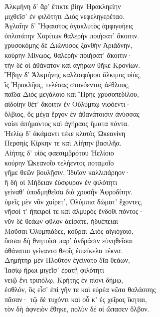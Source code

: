 \begin{pages}
\begin{Leftside}
\quad{}Ἀλκμήνη δ' ἄρ' ἔτικτε βίην Ἡρακληείην\\
μιχθεῖσ' ἐν φιλότητι Διὸς νεφεληγερέταο. \\

\quad{}Ἀγλαΐην δ' Ἥφαιστος ἀγακλυτὸς ἀμφιγυήεις  \\
ὁπλοτάτην Χαρίτων θαλερὴν ποιήσατ' ἄκοιτιν.\\

\quad{}χρυσοκόμης δὲ Διώνυσος ξανθὴν Ἀριάδνην,\\
κούρην Μίνωος, θαλερὴν ποιήσατ' ἄκοιτιν· \\
τὴν δέ οἱ ἀθάνατον καὶ ἀγήρων θῆκε Κρονίων.\\

\quad{}Ἥβην δ' Ἀλκμήνης καλλισφύρου ἄλκιμος υἱός,  \\
ἲς Ἡρακλῆος, τελέσας στονόεντας ἀέθλους,\\
παῖδα Διὸς μεγάλοιο καὶ Ἥρης χρυσοπεδίλου,\\
αἰδοίην θέτ' ἄκοιτιν ἐν Οὐλύμπῳ νιφόεντι· \\
ὄλβιος, ὃς μέγα ἔργον ἐν ἀθανάτοισιν ἀνύσσας\\
ναίει ἀπήμαντος καὶ ἀγήραος ἤματα πάντα. \\

\quad{}Ἠελίῳ δ' ἀκάμαντι τέκε κλυτὸς Ὠκεανίνη \\
Περσηὶς Κίρκην τε καὶ Αἰήτην βασιλῆα.\\
Αἰήτης δ' υἱὸς φαεσιμβρότου Ἠελίοιο\\
κούρην Ὠκεανοῖο τελήεντος ποταμοῖο\\
γῆμε θεῶν βουλῇσιν, Ἰδυῖαν καλλιπάρηον· \\
ἣ δή οἱ Μήδειαν ἐύσφυρον ἐν φιλότητι\\
γείναθ' ὑποδμηθεῖσα διὰ χρυσῆν Ἀφροδίτην. \\

\quad{}ὑμεῖς μὲν νῦν χαίρετ', Ὀλύμπια δώματ' ἔχοντες, \\
νῆσοί τ' ἤπειροί τε καὶ ἁλμυρὸς ἔνδοθι πόντος· \\
νῦν δὲ θεάων φῦλον ἀείσατε, ἡδυέπειαι \\
Μοῦσαι Ὀλυμπιάδες, κοῦραι Διὸς αἰγιόχοιο,\\
ὅσσαι δὴ θνητοῖσι παρ' ἀνδράσιν εὐνηθεῖσαι\\
ἀθάναται γείναντο θεοῖς ἐπιείκελα τέκνα.\\

\quad{}Δημήτηρ μὲν Πλοῦτον ἐγείνατο δῖα θεάων,\\
Ἰασίῳ ἥρωι μιγεῖσ' ἐρατῇ φιλότητι  \\
νειῷ ἔνι τριπόλῳ, Κρήτης ἐν πίονι δήμῳ,\\
ἐσθλόν, ὃς εἶσ' ἐπὶ γῆν τε καὶ εὐρέα νῶτα θαλάσσης\\
πᾶσαν· τῷ δὲ τυχόντι καὶ οὗ κ' ἐς χεῖρας ἵκηται, \\
τὸν δὴ ἀφνειὸν ἔθηκε, πολὺν δέ οἱ ὤπασεν ὄλβον.\\


\end{Leftside}
\end{pages}
